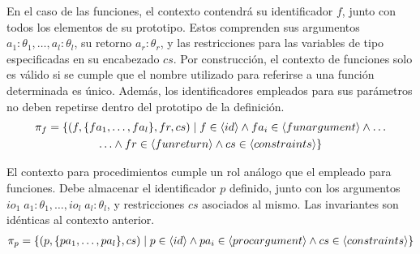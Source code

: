 En el caso de las funciones, el contexto contendrá su identificador $f$, junto con todos los elementos de su prototipo.
Estos comprenden sus argumentos $a_1: \theta_1, \ldots, a_l: \theta_l$, su retorno $a_r: \theta_r$, y las restricciones para las variables de tipo especificadas en su encabezado $cs$.
Por construcción, el contexto de funciones solo es válido si se cumple que el nombre utilizado para referirse a una función determinada es único.
Además, los identificadores empleados para sus parámetros no deben repetirse dentro del prototipo de la definición.
\begin{multline*}
\pi_{f} =
\{
(f, \{ fa_1, \ldots, fa_l \}, fr, cs) \mid
f \in \langle id \rangle
\wedge
fa_i \in \langle funargument \rangle
\wedge
\ldots
\\
\ldots
\wedge
fr \in \langle funreturn \rangle
\wedge
cs \in \langle constraints \rangle
\}
\end{multline*}

El contexto para procedimientos cumple un rol análogo que el empleado para funciones.
Debe almacenar el identificador $p$ definido, junto con los argumentos $io_1 \; a_1: \theta_1, \ldots, io_l \; a_l: \theta_l$, y restricciones $cs$ asociados al mismo.
Las invariantes son idénticas al contexto anterior.
\begin{multline*}
\pi_{p} =
\{
(p, \{ pa_1, \ldots, pa_l \}, cs) \mid
p \in \langle id \rangle
\wedge
pa_i \in \langle procargument \rangle
\wedge
cs \in \langle constraints \rangle
\}
\end{multline*}



